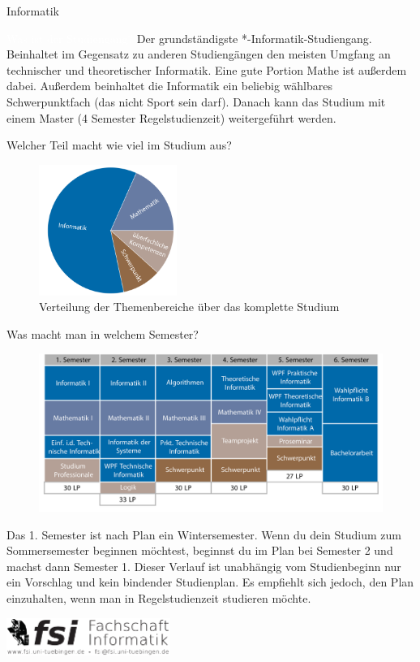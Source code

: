 	\begin{Huge}
			Informatik
		\end{Huge}
		\begin{exampleblock}{\textcolor{white}{Was ist der Studiengang?}}
			Der grundständigste *-Informatik-Studiengang. Beinhaltet im Gegensatz zu anderen Studiengängen den meisten Umgfang an technischer und theoretischer Informatik. Eine gute Portion Mathe ist außerdem dabei. Außerdem beinhaltet die Informatik ein beliebig wählbares Schwerpunktfach (das nicht Sport sein darf). Danach kann das Studium mit einem Master (4 Semester Regelstudienzeit) weitergeführt werden.
		\end{exampleblock}
	
	\begin{block}{Welcher Teil macht wie viel im Studium aus?}
		\begin{figure}[h!]
			\includegraphics[width=0.4\textwidth]{charts/informatik-Piechart.pdf}
			\caption{Verteilung der Themenbereiche über das komplette Studium}
		\end{figure}
	\end{block}
	
	\begin{block}{Was macht man in welchem Semester?}
		\begin{figure}[h!]
			\includegraphics[width=\textwidth]{charts/informatik-Studienplan_abWS18.pdf}
		\end{figure}
		Das 1. Semester ist nach Plan ein Wintersemester. Wenn du dein Studium zum Sommersemester beginnen möchtest, beginnst du im Plan bei Semester 2 und machst dann Semester 1. 
		Dieser Verlauf ist unabhängig vom Studienbeginn nur ein Vorschlag und kein bindender Studienplan. Es empfiehlt sich jedoch, den Plan einzuhalten, wenn man in Regelstudienzeit studieren möchte.
	\end{block}
\vfill
\begin{flushright}
	\includegraphics[width=0.4\textwidth]{fsilogo.pdf}
\end{flushright}
